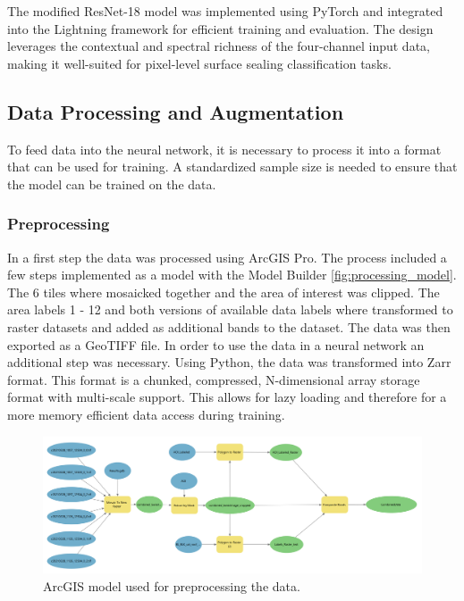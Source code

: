 The modified ResNet-18 model was implemented using PyTorch and integrated into the 
Lightning framework for efficient training and evaluation. The design leverages the 
contextual and spectral richness of the four-channel input data, making it well-suited 
for pixel-level surface sealing classification tasks.

\subsection{Data Processing and Augmentation}%

To feed data into the neural network, it is necessary to process it into a format that can be used for training.
A standardized sample size is needed to ensure that the model can be trained on the data.


\subsubsection{Preprocessing}%
In a first step the data was processed using ArcGIS Pro. The process included a few steps implemented as
a model with the Model Builder \autoref{fig:processing_model}. The 6 tiles where mosaicked together and the area of interest 
was clipped. The area labels 1 - 12 and both versions of available data labels where transformed to raster datasets
and added as additional bands to the dataset. The data was then exported as a GeoTIFF file.
In order to use the data in a neural network an additional step was necessary. Using Python,
the data was transformed into Zarr format. This format is a chunked, compressed, N-dimensional array
storage format with multi-scale support. This allows for lazy loading and therefore for a more memory
efficient data access during training.

\begin{figure}[H]
    \centering
    \captionsetup{width=0.8\linewidth}
    \includegraphics[width=\linewidth]{figures/ArcGIS_Model.png}
    \caption{ArcGIS model used for preprocessing the data.}
    \label{fig:processing_model}
\end{figure}



